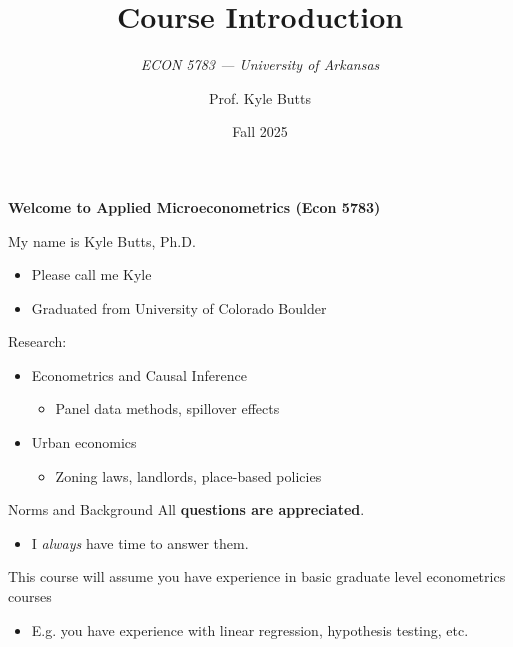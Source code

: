 \documentclass[aspectratio=169,t,11pt,table]{beamer}
\title{Course Introduction}
\subtitle{\it  ECON 5783 — University of Arkansas}
\date{Fall 2025}
\author{Prof. Kyle Butts}
\begin{document}
\begin{frame}
\maketitle

\end{frame}

\begin{frame}{}
  \bigskip
  \begin{center}
    \alert{\Large\bf Welcome to Applied Microeconometrics (Econ 5783)}
  \end{center}

  \bigskip
  My name is Kyle Butts, Ph.D.
  \begin{itemize}
    \item Please call me Kyle
    
    \item Graduated from University of Colorado Boulder
  \end{itemize}  

  \bigskip
  Research: 
  \begin{itemize}
    \item Econometrics and Causal Inference
    \begin{itemize}
      \item Panel data methods, spillover effects
    \end{itemize}
    \item Urban economics 
    \begin{itemize}
      \item Zoning laws, landlords, place-based policies
    \end{itemize}
  \end{itemize}
\end{frame}

\begin{frame}{Norms and Background}
  All \alert{\bf questions are appreciated}. 
  \begin{itemize}
    \item I \emph{always} have time to answer them.
  \end{itemize}

  \pause
  \bigskip
  This course will assume you have experience in basic graduate level econometrics courses
  \begin{itemize}
    \item E.g. you have experience with linear regression, hypothesis testing, etc. 
  \end{itemize}
\end{frame}
\end{document}
